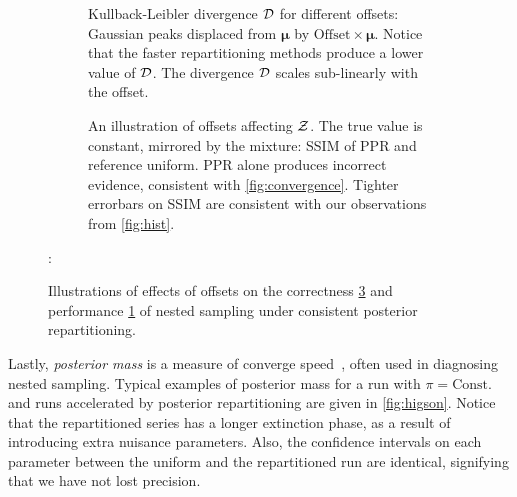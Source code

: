 \documentclass[usenatbib]{mnras}
\begin{document}
\begin{figure} \centering
  \begin{subfigure}{0.86\columnwidth}
    \centering

    
    \caption{Kullback-Leibler divergence \({\cal D}\) for different
      offsets: Gaussian peaks displaced from \(\bm{\mu}\) by
      \(\text{Offset}\times \bm{\mu}\). Notice that the faster
      repartitioning methods produce a lower value of \({\cal
        D}\). The divergence \({\cal D}\) scales sub-linearly with the
      offset.\label{fig:kl-d}}
\end{subfigure}

\begin{subfigure}{0.86\columnwidth}
  \centering

  
  
  \caption{An illustration of offsets affecting ${\cal Z}$. The true
    value is constant, mirrored by the mixture: SSIM of PPR and
    reference uniform. PPR alone produces incorrect evidence,
    consistent with \cref{fig:convergence}. Tighter errorbars on SSIM
    are consistent with our observations from
    \cref{fig:hist}.\label{fig:drift}}
\end{subfigure}
\caption{Illustrations of effects of offsets on the correctness
  \ref{fig:drift} and performance \ref{fig:kl-d} of nested sampling
  under consistent posterior repartitioning.}
:\end{figure}



Lastly, \emph{posterior mass} is a measure of converge
speed~\cite{higson2018nestcheck}, often used in diagnosing nested
sampling. Typical examples of posterior mass for a run with
$\pi=\text{Const.}$ and runs accelerated by posterior repartitioning
are given in \cref{fig:higson}. Notice that the repartitioned series
has a longer extinction phase, as a result of introducing extra
nuisance parameters. Also, the confidence intervals on each parameter
between the uniform and the repartitioned run are identical,
signifying that we have not lost precision.
\end{document}
